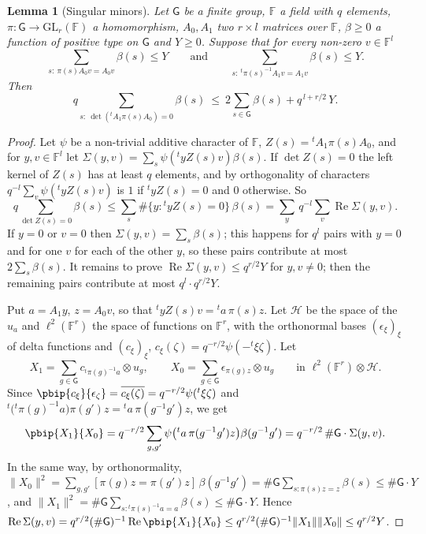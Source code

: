 \documentclass[10pt]{amsart}
\newtheorem{lemma}[theorem]{Lemma}
\theoremstyle{definition}
\theoremstyle{remark}
\newcommand{\Rel}{\operatorname{Re}}
\providecommand{\auF}{\mathbb F}
\providecommand{\auGL}{\mathrm{GL}}
\providecommand{\aubar}[1]{\overline{#1}}
\begin{document}
\begin{lemma}[Singular minors]\label{pb:singular}
Let $\mathsf G$ be a finite group, $\auF$ a field with $q$ elements, $\pi\colon\mathsf G\to\auGL_r
(\auF)$ a homomorphism, $A_0,A_1$ two $r\times l$ matrices over $\auF$, $\beta\ge0$ a function of
positive type on $\mathsf G$ and $Y\ge0$. Suppose that for every non-zero $v\in\auF^l$
\[
\sum_{s:\ \pi(s)A_0v=A_0v}\beta(s)\le Y\qquad\text{and}\qquad\sum_{s:\ {}^t\pi(s)^{-1}A_1v=A_1v}
\beta(s)\le Y .
\]
Then
\[
q\sum_{s:\ \det({}^tA_1\pi(s)A_0)=0}\beta(s)\ \le\ 2\sum_{s\in\mathsf G}\beta(s)+q^{\,l+r/2}\,Y .
\]
\end{lemma}
\begin{proof}
Let $\psi$ be a non-trivial additive character of $\auF$, $Z(s)={}^tA_1\pi(s)A_0$, and for $y,v\in
\auF^l$ let $\Sigma(y,v)=\sum_s\psi({}^tyZ(s)v)\beta(s)$. If $\det Z(s)=0$ the left kernel of
$Z(s)$ has at least $q$ elements, and by orthogonality of characters $q^{-l}\sum_v\psi({}^tyZ(s)
v)$ is $1$ if ${}^tyZ(s)=0$ and $0$ otherwise. So
\[
q\sum_{\det Z(s)=0}\beta(s)\le\sum_s\#\{y:{}^tyZ(s)=0\}\,\beta(s)=\sum_y\,q^{-l}\sum_v\Rel\Sigma(y,
v).
\]
If $y=0$ or $v=0$ then $\Sigma(y,v)=\sum_s\beta(s)$; this happens for $q^l$ pairs with $y=0$ and
for one $v$ for each of the other $y$, so these pairs contribute at most $2\sum_s\beta(s)$. It
remains to prove $\Rel\Sigma(y,v)\le q^{r/2}Y$ for $y,v\ne0$; then the remaining pairs contribute at
most $q^l\cdot q^{r/2}Y$.

Put $a=A_1y$, $z=A_0v$, so that ${}^tyZ(s)v={}^ta\,\pi(s)z$. Let $\mathcal H$ be the space of the
$u_a$ and $\ell^2(\auF^r)$ the space of functions on $\auF^r$, with the orthonormal bases
$(\epsilon_\xi)_\xi$ of delta functions and $(c_\xi)_\xi$, $c_\xi(\zeta)=q^{-r/2}\psi(-{}^t\xi
\zeta)$. Let
\[
X_1=\sum_{g\in\mathsf G}c_{{}^t\pi(g)^{-1}a}\otimes u_g,\qquad X_0=\sum_{g\in\mathsf G}\epsilon_{\pi(g)
z}\otimes u_g\qquad\text{in }\ell^2(\auF^r)\otimes\mathcal H .
\]
Since $\pbip{c_\xi}{\epsilon_\zeta}=\aubar{c_\xi(\zeta)}=q^{-r/2}\psi({}^t\xi\zeta)$ and ${}^t\bigl(
{}^t\pi(g)^{-1}a\bigr)\pi(g')z={}^ta\,\pi(g^{-1}g')z$, we get
\[
\pbip{X_1}{X_0}=q^{-r/2}\sum_{g,g'}\psi\bigl({}^ta\,\pi(g^{-1}g')z\bigr)\beta(g^{-1}g')=q^{-r/2}\,\#
\mathsf G\cdot\Sigma(y,v) .
\]
In the same way, by orthonormality, $\|X_0\|^2=\sum_{g,g'}[\pi(g)z=\pi(g')z]\,
\beta(g^{-1}g')=\#\mathsf G\sum_{s:\pi(s)z=z}\beta(s)\le\#\mathsf G\cdot Y$, and $\|X_1\|^2=\#
\mathsf G\sum_{s:{}^t\pi(s)^{-1}a=a}\beta(s)\le\#\mathsf G\cdot Y$. Hence $\Rel\Sigma(y,v)=q^{r/2}
(\#\mathsf G)^{-1}\Rel\pbip{X_1}{X_0}\le q^{r/2}(\#\mathsf G)^{-1}\|X_1\|\|X_0\|\le q^{r/2}Y$.
\end{proof}
\end{document}
